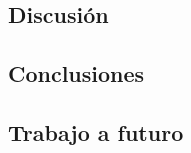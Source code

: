 \documentclass{beamer}
\begin{document}

%


\subsection{Discusi\'on}


\subsection{Conclusiones}


\subsection{Trabajo a futuro}


%


\end{document}
